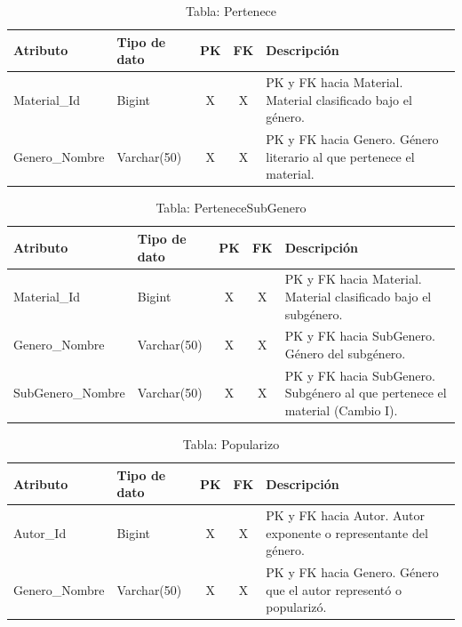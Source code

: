 \documentclass[12pt,a4paper]{article}
\begin{document}
\begin{table}[H]
\centering
\begin{tabularx}{\textwidth}{|l|l|c|c|X|}
\hline
\textbf{Atributo} & \textbf{Tipo de dato} & \textbf{PK} & \textbf{FK} & \textbf{Descripción} \\ \hline
Material\_Id  & Bigint      & X & X & PK y FK hacia Material. Material clasificado bajo el género. \\ \hline
Genero\_Nombre & Varchar(50) & X & X & PK y FK hacia Genero. Género literario al que pertenece el material. \\ \hline
\end{tabularx}
\caption{Tabla: Pertenece}
\end{table}

\begin{table}[H]
\centering
\begin{tabularx}{\textwidth}{|l|l|c|c|X|}
\hline
\textbf{Atributo} & \textbf{Tipo de dato} & \textbf{PK} & \textbf{FK} & \textbf{Descripción} \\ \hline
Material\_Id      & Bigint      & X & X & PK y FK hacia Material. Material clasificado bajo el subgénero. \\ \hline
Genero\_Nombre    & Varchar(50) & X & X & PK y FK hacia SubGenero. Género del subgénero. \\ \hline
SubGenero\_Nombre & Varchar(50) & X & X & PK y FK hacia SubGenero. Subgénero al que pertenece el material (Cambio I). \\ \hline
\end{tabularx}
\caption{Tabla: PerteneceSubGenero}
\end{table}

\begin{table}[H]
\centering
\begin{tabularx}{\textwidth}{|l|l|c|c|X|}
\hline
\textbf{Atributo} & \textbf{Tipo de dato} & \textbf{PK} & \textbf{FK} & \textbf{Descripción} \\ \hline
Autor\_Id      & Bigint      & X & X & PK y FK hacia Autor. Autor exponente o representante del género. \\ \hline
Genero\_Nombre & Varchar(50) & X & X & PK y FK hacia Genero. Género que el autor representó o popularizó. \\ \hline
\end{tabularx}
\caption{Tabla: Popularizo}
\end{table}
\end{document}
